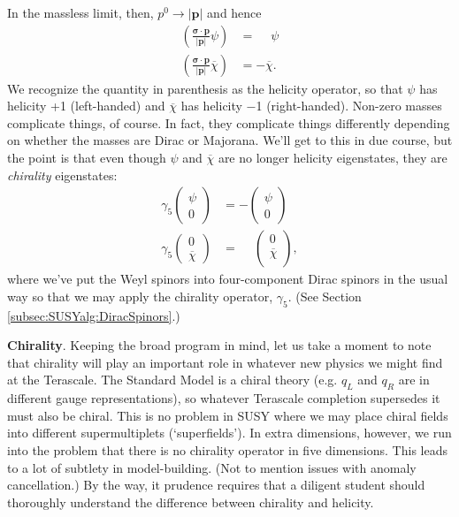 \documentclass[12pt]{article}
\numberwithin{equation}{section}    %
\begin{document}
In the massless limit, then, $p^0\rightarrow |\mathbf p|$ and hence 
\begin{align}
	\left(\frac{\mathbf\sigma\cdot\mathbf p}{|\mathbf{p}|}\psi\right) &= \phantom+ \psi\\
	\left(\frac{\mathbf\sigma\cdot\mathbf p}{|\mathbf{p}|}\overline\chi\right) &= -\overline\chi.
\end{align}
We recognize the quantity in parenthesis as the helicity operator, so that $\psi$ has helicity +1 (left-handed) and $\overline\chi$ has helicity $-$1 (right-handed). Non-zero masses complicate things, of course. In fact, they complicate things differently depending on whether the masses are Dirac or Majorana. We'll get to this in due course, but the point is that even though $\psi$ and $\overline\chi$ are no longer helicity eigenstates, they are \emph{chirality} eigenstates:
\begin{align}
	\gamma_5\begin{pmatrix}\psi\\0\end{pmatrix} &= -\begin{pmatrix}\psi\\0\end{pmatrix}\\
	\gamma_5\begin{pmatrix}0\\\overline\chi\end{pmatrix} &=\phantom - \begin{pmatrix}0\\\overline\chi\\\end{pmatrix},
\end{align}
where we've put the Weyl spinors into four-component Dirac spinors in the usual way so that we may apply the chirality operator, $\gamma_5$. (See Section \ref{subsec:SUSYalg:DiracSpinors}.)

\vspace{.5em}
\begin{framed}
	\noindent\textbf{Chirality}. Keeping the broad program in mind, let us take a moment to note that chirality will play an important role in whatever new physics we might find at the Terascale. The Standard Model is a chiral theory (e.g. $q_L$ and $q_R$ are in different gauge representations), so whatever Terascale completion supersedes it must also be chiral. This is no problem in SUSY where we may place chiral fields into different supermultiplets (`superfields'). In extra dimensions, however, we run into the problem that there is no chirality operator in five dimensions. This leads to a lot of subtlety in model-building. (Not to mention issues with anomaly cancellation.) By the way, it prudence requires that a diligent student should thoroughly understand the difference between chirality and helicity.
%	
\end{framed}
\vspace{.5em}
\end{document}
